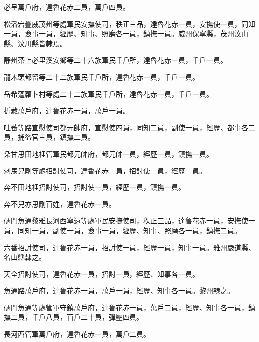 \begin{pinyinscope}
 必呈萬戶府，達魯花赤二員，萬戶四員。



 松潘宕疊威茂州等處軍民安撫使司，秩正三品，達魯花赤一員，安撫使一員，同知一員，僉事一員，經歷、知事、照磨各一員，鎮撫一員。威州保寧縣，茂州汶山縣、汶川縣皆隸焉。



 靜州茶上必里溪安鄉等二十六族軍民千戶所，達魯花赤一員，千戶一員。



 龍木頭都留等二十二族軍民千戶所，達魯花赤一員，千戶一員。



 岳希蓬蘿卜村等處二十二族軍民千戶所，達魯花赤一員，千戶一員。



 折藏萬戶府，達魯花赤一員，萬戶一員。



 吐蕃等路宣慰使司都元帥府，宣慰使四員，同知二員，副使一員，經歷、都事各二員，捕盜官三員，鎮撫二員。



 朵甘思田地裡管軍民都元帥府，都元帥一員，經歷一員，鎮撫一員。



 剌馬兒剛等處招討使司，達魯花赤一員，招討使一員，經歷一員。



 奔不田地裡招討使司，招討使一員，經歷一員，鎮撫一員。



 奔不兒亦思剛百姓，達魯花赤一員。



 碉門魚通黎雅長河西寧遠等處軍民安撫使司，秩正三品，達魯花赤一員，安撫使一員，同知一員，副使一員，僉事一員，經歷、知事、照磨各一員，鎮撫二員。



 六番招討使司，達魯花赤一員，招討使一員，經歷一員，知事一員。雅州嚴道縣、名山縣隸之。



 天全招討使司，達魯花赤一員，招討一員，經歷、知事各一員。



 魚通路萬戶府，達魯花赤一員，萬戶一員，經歷、知事各一員。黎州隸之。



 碉門魚通等處管軍守鎮萬戶府，達魯花赤一員，萬戶二員，經歷、知事各一員，鎮撫二員，千戶八員，百戶二十員，彈壓四員。



 長河西管軍萬戶府，達魯花赤一員，萬戶二員。




\end{pinyinscope}
